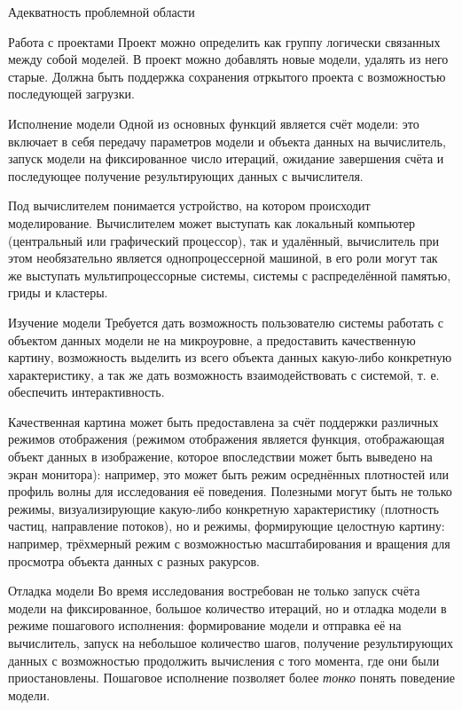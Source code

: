 \documentclass[a4paper,12pt]{extarticle}
\begin{document}
\begin{subsection}{Адекватность проблемной области}
\begin{subsubsection}{Работа с проектами}
        Проект можно определить как группу логически связанных между собой моделей. В проект можно добавлять новые модели, удалять из него старые. Должна быть поддержка сохранения отркытого проекта с возможностью последующей загрузки.
    \end{subsubsection}
        
    \begin{subsubsection}{Исполнение модели} 
        Одной из основных функций является счёт модели: это включает в себя передачу параметров модели и объекта данных на вычислитель, запуск модели на фиксированное число итераций, ожидание завершения счёта и последующее получение результирующих данных с вычислителя.
        
        Под вычислителем понимается устройство, на котором происходит моделирование. Вычислителем может выступать как локальный компьютер (центральный или графический процессор), так и удалённый, вычислитель при этом необязательно является однопроцессерной машиной, в его роли могут так же выступать мультипроцессорные системы, системы с распределённой памятью, гриды и кластеры.
    \end{subsubsection}
        
    \begin{subsubsection}{Изучение модели}
        Требуется дать возможность пользователю системы работать с объектом данных модели не на микроуровне, а предоставить качественную картину, возможность выделить из всего объекта данных какую-либо конкретную характеристику, а так же дать возможность взаимодействовать с системой, т. е. обеспечить интерактивность.
        
        Качественная картина может быть предоставлена за счёт поддержки различных режимов отображения (режимом отображения является функция, отображающая объект данных в изображение, которое впоследствии может быть выведено на экран монитора): например, это может быть режим осреднённых плотностей или профиль волны для исследования её поведения. Полезными могут быть не только режимы, визуализирующие какую-либо конкретную характеристику (плотность частиц, направление потоков), но и режимы, формирующие целостную картину: например, трёхмерный режим с возможностью масштабирования и вращения для просмотра объекта данных с разных ракурсов.
    \end{subsubsection}
        
    \begin{subsubsection}{Отладка модели}
        Во время исследования востребован не только запуск счёта модели на фиксированное, большое количество итераций, но и отладка модели в режиме пошагового исполнения: формирование модели и отправка её на вычислитель, запуск на небольшое количество шагов, получение результирующих данных с возможностью продолжить вычисления с того момента, где они были приостановлены. Пошаговое исполнение позволяет более \textit{тонко} понять поведение модели.
        

\end{subsubsection}
\end{subsection}
\end{document}
